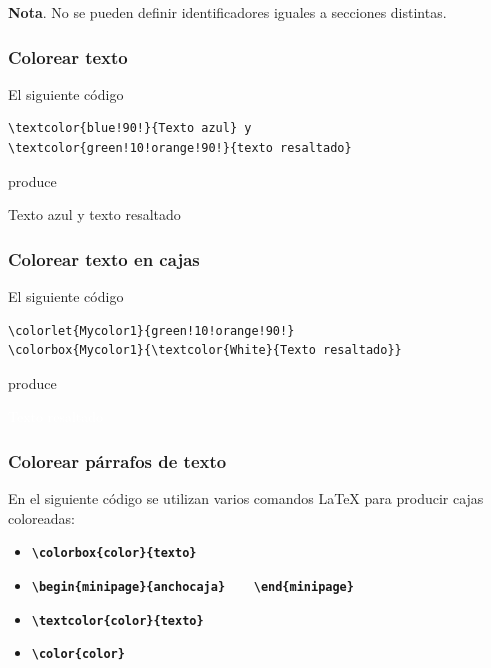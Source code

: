 \documentclass[12pt,a4paper,oneside,]{article}
\providecommand{\tightlist}{%
  \setlength{\itemsep}{0pt}\setlength{\parskip}{0pt}}
\numberwithin{dummy}{section}
\theoremstyle{ocrenumbox}
\theoremstyle{blacknumex}
\theoremstyle{blacknumbox}
\theoremstyle{ocrenum}
\theoremstyle{ocrenum}
\begin{document}
\textbf{Nota}. No se pueden definir identificadores iguales a secciones
distintas.

\hypertarget{colorear-texto}{%
\subsubsection{Colorear texto}\label{colorear-texto}}

El siguiente código

\begin{verbatim}
\textcolor{blue!90!}{Texto azul} y 
\textcolor{green!10!orange!90!}{texto resaltado}
\end{verbatim}

produce

\textcolor{blue!90!}{Texto azul} y
\textcolor{green!10!orange!90!}{texto resaltado}

\hypertarget{colorear-texto-en-cajas}{%
\subsubsection{Colorear texto en cajas}\label{colorear-texto-en-cajas}}

El siguiente código

\begin{verbatim}
\colorlet{Mycolor1}{green!10!orange!90!}
\colorbox{Mycolor1}{\textcolor{White}{Texto resaltado}}
\end{verbatim}

produce


\colorbox{Mycolor1}{\textcolor{White}{Texto resaltado}}

\hypertarget{colorear-puxe1rrafos-de-texto}{%
\subsubsection{Colorear párrafos de
texto}\label{colorear-puxe1rrafos-de-texto}}

En el siguiente código se utilizan varios comandos LaTeX para producir
cajas coloreadas:

\begin{itemize}
\tightlist
\item
  \textbf{\texttt{\textbackslash{}colorbox\{color\}\{texto\}}}
\item
  \textbf{\texttt{\textbackslash{}begin\{minipage\}\{anchocaja\}\ \ \ \ \textbackslash{}end\{minipage\}}}
\item
  \textbf{\texttt{\textbackslash{}textcolor\{color\}\{texto\}}}
\item
  \textbf{\texttt{\textbackslash{}color\{color\}}}
\end{itemize}
\end{document}
